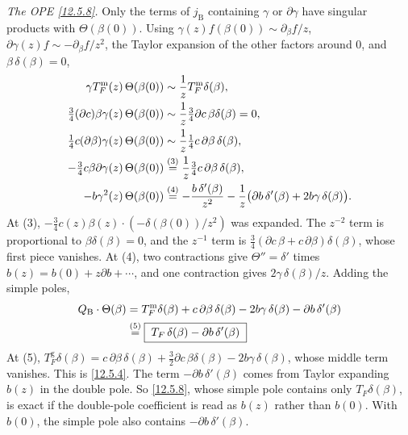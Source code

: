 \begin{tcolorbox}[breakable]
\begin{remark}
		\emph{The OPE \eqref{12.5.8}.} Only the terms of $j_{\mathrm B}$ containing $\gamma$ or $\partial\gamma$ have singular products with $\Theta(\beta(0))$. Using $\gamma(z)f(\beta(0))\sim\partial_{\beta}f/z$, $\partial\gamma(z)f\sim-\partial_{\beta}f/z^{2}$, the Taylor expansion of the other factors around $0$, and $\beta\,\delta(\beta)=0$,
		\begin{align*}
			\gamma T_{F}^{\mathrm m}(z)\,\Theta(\beta(0))&\sim\frac{1}{z}T_{F}^{\mathrm m}\delta(\beta) ,\\
			\tfrac34(\partial c)\beta\gamma(z)\,\Theta(\beta(0))&\sim\frac1z\tfrac34\partial c\,\beta\delta(\beta)=0 ,\\
			\tfrac14 c(\partial\beta)\gamma(z)\,\Theta(\beta(0))&\sim\frac1z\tfrac14c\,\partial\beta\,\delta(\beta) ,\\
			-\tfrac34c\beta\partial\gamma(z)\,\Theta(\beta(0))&\overset{(3)}{=} \frac1z\tfrac34c\,\partial\beta\,\delta(\beta) ,\\
			-b\gamma^{2}(z)\,\Theta(\beta(0))&\overset{(4)}{=} -\frac{b\,\delta'(\beta)}{z^{2}}-\frac{1}{z}\bigl(\partial b\,\delta'(\beta)+2b\gamma\,\delta(\beta)\bigr) .
		\end{align*}
		At (3), $-\frac34c(z)\beta(z)\cdot(-\delta(\beta(0))/z^{2})$ was expanded. The $z^{-2}$ term is proportional to $\beta\delta(\beta)=0$, and the $z^{-1}$ term is $\frac34(\partial c\,\beta+c\,\partial\beta)\delta(\beta)$, whose first piece vanishes. At (4), two contractions give $\Theta''=\delta'$ times $b(z)=b(0)+z\partial b+\cdots$, and one contraction gives $2\gamma\,\delta(\beta)/z$. Adding the simple poles,
		\begin{align*}
			Q_{\mathrm B}\cdot\Theta(\beta)&=T_{F}^{\mathrm m}\delta(\beta)+c\,\partial\beta\,\delta(\beta)-2b\gamma\,\delta(\beta)-\partial b\,\delta'(\beta)\\
			&\overset{(5)}{=} \boxed{\;T_{F}\,\delta(\beta)-\partial b\,\delta'(\beta)\;}
		\end{align*}
		At (5), $T_{F}^{\mathrm g}\delta(\beta)=c\,\partial\beta\,\delta(\beta)+\frac32\partial c\,\beta\delta(\beta)-2b\gamma\,\delta(\beta)$, whose middle term vanishes. This is \eqref{12.5.4}. The term $-\partial b\,\delta'(\beta)$ comes from Taylor expanding $b(z)$ in the double pole. So \eqref{12.5.8}, whose simple pole contains only $T_{F}\delta(\beta)$, is exact if the double-pole coefficient is read as $b(z)$ rather than $b(0)$. With $b(0)$, the simple pole also contains $-\partial b\,\delta'(\beta)$.
	\end{remark}
\end{tcolorbox}

